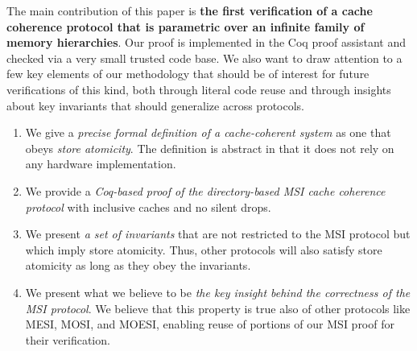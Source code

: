 The main contribution of this paper is \textbf{the first verification of a
cache coherence protocol that is parametric over an infinite family of
memory hierarchies}.  Our proof is implemented in the Coq proof assistant and
checked via a very small trusted code base.  We also want to draw attention to
a few key elements of our methodology that should be of interest for future
verifications of this kind, both through literal code reuse and through insights
about key invariants that should generalize across protocols.
\begin{enumerate}
\item We give a \emph{precise formal definition of a cache-coherent system} as one
that obeys \emph{store atomicity}. The definition is abstract in that it does not
rely on any hardware implementation.
\item We provide a \emph{Coq-based proof of the directory-based MSI cache coherence
protocol} with inclusive caches and no silent drops.
\item We present \emph{a set of invariants} that are not restricted to the MSI
protocol but which imply store atomicity. Thus, other protocols will also
satisfy store atomicity as long as they obey the invariants.
\item We present what we believe to be \emph{the key insight behind the
correctness of the MSI protocol}. We believe that this property is true also of
other protocols like MESI, MOSI, and MOESI, enabling reuse of portions of our
MSI proof for their verification.
\end{enumerate}
%

